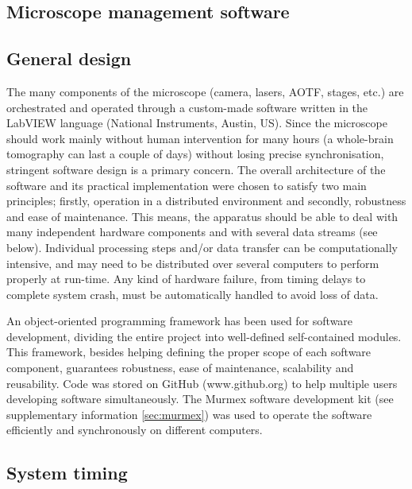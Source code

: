 \documentclass[12pt]{spieman}  %
\begin{document}
\begin{spacing}{2}
\section{Microscope management software}

\subsection{General design}
The many components of the microscope (camera, lasers, AOTF, stages, etc.) are orchestrated and operated through a custom-made software written in the LabVIEW language (National Instruments, Austin, US). Since the microscope should work mainly without human intervention for many hours (a whole-brain tomography can last a couple of days) without losing precise synchronisation, stringent software design is a primary concern. The overall architecture of the software and its practical implementation were chosen to satisfy two main principles; firstly, operation in a distributed environment and secondly, robustness and ease of maintenance. This means, the apparatus should be able to deal with many independent hardware components and with several data streams (see below). Individual processing steps and/or data transfer can be computationally intensive, and may need to be distributed over several computers to perform properly at run-time. Any kind of hardware failure, from timing delays to complete system crash, must be automatically handled to avoid loss of data.

An object-oriented programming framework \cite{castagna1997object} has been used for software development, dividing the entire project into well-defined self-contained modules. This framework, besides helping defining the proper scope of each software component, guarantees robustness, ease of maintenance, scalability and reusability. Code was stored on GitHub (www.github.org) to help multiple users developing software simultaneously. The Murmex software development kit (see supplementary information \ref{sec:murmex}) was used to operate the software efficiently and synchronously on different computers.



\subsection{System timing}
\label{sec:timing}


\end{spacing}
\end{document}
